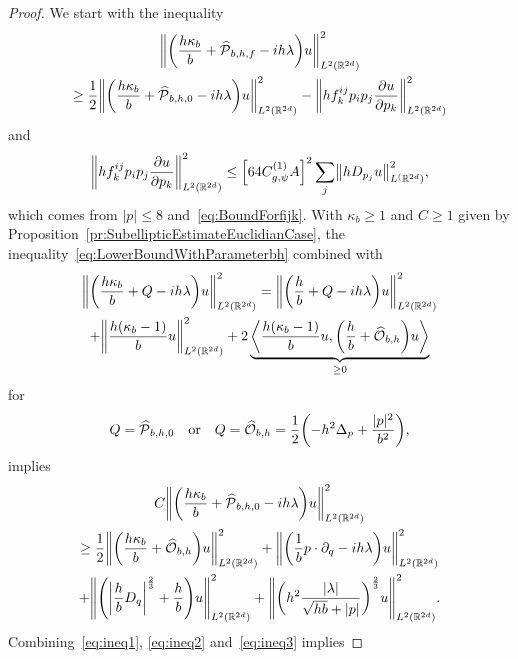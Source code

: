 \documentclass[AHL,Unicode,longabstracts]{cedram}
\newcommand{\R}{\mathbb{R}}
\newcommand{\clO}{\mathcal{O}}
\newcommand{\clP}{\mathcal{P}}
\newcommand\norm[1]{\left\lVert#1\right\rVert}
\let\oldhat\hat
\renewcommand*{\hat}[1]{\mathchoice{\widehat{#1}}{\widehat{#1}}{\oldhat{#1}}{\oldhat{#1}}}
\let\originalleft\left
\let\originalright\right
\renewcommand{\left}{\mathopen{}\mathclose\bgroup\originalleft}
\renewcommand{\right}{\aftergroup\egroup\originalright}
\begin{document}
\begin{proof}
We start with the inequality
\begin{multline}\label{eq:ineq1}
\left\| \left(\frac{h\kappa_b}{b} + \hat{\clP}_{b,h,f} - i h\lambda \right) u \right\|_{L^2(\R^{2d})}^{2}\\
\geq \frac{1}{2} \left\| \left(\frac{h\kappa_b}{b}+\hat{\clP}_{b,h,0} -i h\lambda \right) u\right\|_{L^2(\R^{2d})}^2- \left\| h f^{ij}_{k}p_{i}p_{j}\frac{\partial u}{\partial p_{k}} \right\|_{L^2(\R^{2d})}^{2}
\end{multline}
and
\begin{equation}\label{eq:ineq2}
\left\|hf^{ij}_k p_ip_j \frac{\partial u}{ \partial p_k}\right\|_{L^2(\R^{2d})}^2\leq \left[64 C_{g,\psi}^{(1)} A\right]^2 \sum_j\left\|hD_{p_j} u \right\|_{L^(\R^{2d})}^2,
\end{equation}
which comes from $|p|\leq 8$ and~\eqref{eq:BoundForfijk}. With $\kappa_b\geq 1$ and $C\geq 1$ given by Proposition~\ref{pr:SubellipticEstimateEuclidianCase}, the inequality~\eqref{eq:LowerBoundWithParameterbh} combined with
\begin{multline*}
\norm{\left(\frac{h\kappa_b}{b}+Q-ih\lambda\right)u}_{L^2(\R^{2d})}^2 =\norm{\left(\frac{h}{b}+Q-ih\lambda\right)u}_{L^2(\R^{2d})}^2\\
+\norm{\frac{h(\kappa_b-1)}{b}u}_{L^2(\R^{2d})}^2
+2\underbrace{\left\langle \frac{h(\kappa_b-1)}{b}u, \left(\frac{h}{b}+\hat{\clO}_{b,h}\right)u\right\rangle}_{\geq 0}
\end{multline*}
for 
\begin{align*}
Q =\hat{\clP}_{b,h,0}\quad\text{or}\quad Q=\hat{\clO}_{b,h}=\frac{1}{2}\left(-h^2\Delta_p+\frac{|p|^2}{b^2}\right),
\end{align*}
implies
\begin{multline}\label{eq:ineq3}
C \left\| \left(\frac{ h\kappa_b}{b} + \hat{\clP}_{b,h,0} - i h\lambda \right) u \right\|_{L^2(\R^{2d})}^{2} \\
\geq \frac{1}{2}
\left\| \left(\frac{h\kappa_b}{b}+\hat{\clO}_{b,h}\right) u \right\|_{L^2(\R^{2d})}^{2} +
\left\| \left(\frac{1}{b} p\cdot\partial_q-i h\lambda \right)u \right\|_{L^2(\R^{2d})}^{2}
\\+ \left\| \left(\left|\frac{h}{b}D_{q} \right|^{\frac{2}{3}} + \frac{h}{b}\right) u \right\|_{L^2(\R^{2d})}^{2} + \left\| \left(h^2 \frac{|\lambda|}{\sqrt{hb}+|p|} \right)^{\frac{2}{3}} u \right\|_{L^2(\R^{2d})}^{2}.
\end{multline}
Combining~\eqref{eq:ineq1}, \eqref{eq:ineq2} and~\eqref{eq:ineq3} implies

\end{proof}
\end{document}

